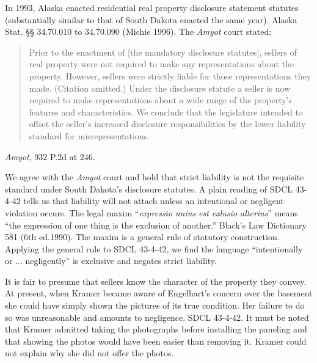 In 1993, Alaska enacted residential real property disclosure statement statutes
(substantially similar to that of South Dakota enacted the same year). Alaska
Stat. {\S}{\S} 34.70.010 to 34.70.090 (Michie
1996). The
\textit{Amyot} court stated:
\begin{quote}
Prior to the enactment of [the mandatory disclosure statutes], sellers of real
property were not required to make any representations about the property.
However, sellers were strictly liable for those representations they made.
(Citation omitted.) Under the disclosure statute a seller is now required to
make representations about a wide range of the property's features and
characteristics. We conclude that the legislature intended to offset the
seller's increased disclosure responsibilities by the lower liability standard
for misrepresentations.
\end{quote}
\textit{Amyot}, 932 P.2d at 246.

We agree with the \textit{Amyot} court and hold that strict liability is not the
requisite standard under South Dakota's disclosure statutes. A plain reading of
SDCL 43-4-42 tells us that liability will not attach unless an intentional or
negligent violation occurs. The legal maxim ``\textit{expressio unius est
exlusio alterius}{}'' means ``the expression of one thing is the exclusion of
another.'' Black's Law Dictionary 581 (6th ed.1990). The maxim is a general
rule of statutory construction. Applying the general rule to SDCL 43-4-42, we
find the language ``intentionally or ... negligently'' is exclusive and negates
strict liability.

It is fair to presume that sellers know the character of the property they
convey. At present, when Kramer became aware of Engelhart's concern over the
basement she could have simply shown the pictures of its true condition. Her
failure to do so was unreasonable and amounts to negligence. SDCL 43-4-42. It
must be noted that Kramer admitted taking the photographs before installing the
paneling and that showing the photos would have been easier than removing it.
Kramer could not explain why she did not offer the photos.

